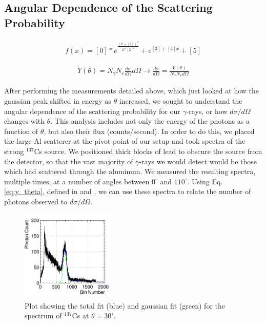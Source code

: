 \documentclass[%
 reprint,
 amsmath,amssymb,
 aps,
 pra,
]{revtex4-1}
\begin{document}
\subsection{Angular Dependence of the Scattering Probability}

\begin{gather}\label{eq:fitfunction}
	f(x) = [0]*e^{\frac{(x-[1])^2}{2*[2]^2}} + e^{[3]+[4]x} + [5]
\end{gather}

\begin{gather}\label{eq:y_theta}
	Y(\theta) = N_\gamma N_e \frac{d\sigma}{d\Omega}d\Omega \rightarrow \frac{d\sigma}{d\Omega} = \frac{Y(\theta)}{N_\gamma N_e d\Omega}
\end{gather}

After performing the measurements detailed above, which just looked at how the gaussian peak shifted in energy as $\theta$ increased, we sought to understand the angular dependence of the scattering probability for our $\gamma$-rays, or how $d \sigma / d \Omega$ changes with $\theta$. This analysis includes not only the energy of the photons as a function of $\theta$, but also their flux (counts/second). In order to do this, we placed the large Al scatterer at the pivot point of our setup and took spectra of the strong $^{137}$Cs source. We positioned thick blocks of lead to obscure the source from the detector, so that the vast majority of $\gamma$-rays we would detect would be those which had scattered through the aluminum. We measured the resulting spectra, multiple times, at a number of angles between $0^{\circ}$ and $110^{\circ}$. Using Eq. \ref{eq:y_theta}, defined in \cite{milissinos} and \cite{manual}, we can use these spectra to relate the number of photons observed to $d\sigma / d\Omega$. 

\begin{figure}[H]
	\centering
	\includegraphics[width=0.4\textwidth]{GaussianPortion.png}
	\caption{Plot showing the total fit (blue) and gaussian fit (green) for the spectrum of $^{137}$Cs at $\theta = 30^\circ$.}
	\label{GaussianPortion}
\end{figure}
\end{document}
